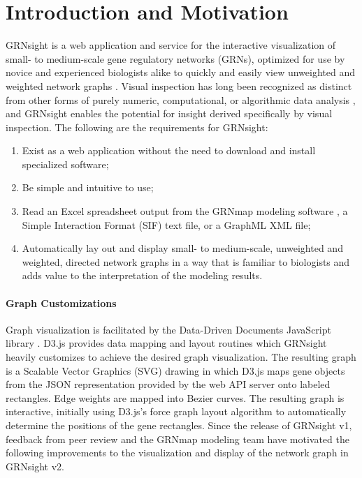 \documentclass[sigconf,review]{acmart}
\begin{document}
\section{Introduction and Motivation}

GRNsight is a web application and service for the interactive visualization of small- to medium-scale gene regulatory networks (GRNs), optimized for use by novice and experienced biologists alike to quickly and easily view unweighted and weighted network graphs \cite{peerj}. Visual inspection has long been recognized as distinct from other forms of purely numeric, computational, or algorithmic data analysis \cite{Tufte:1986:VDQ:33404, card1999readings}, and GRNsight enables the potential for insight derived specifically by visual inspection. The following are the requirements for GRNsight:

\begin{enumerate}
\item Exist as a web application without the need to download and install specialized software;
\item Be simple and intuitive to use;
\item Read an Excel spreadsheet output from the GRNmap modeling software \cite{Dahlquist2015}, a Simple Interaction Format (SIF) text file, or a GraphML XML file;
\item Automatically lay out and display small- to medium-scale, unweighted and weighted, directed network graphs in a way that is familiar to biologists and adds value to the interpretation of the modeling results.
\end{enumerate} 

\paragraph{Graph Customizations} Graph visualization is facilitated by the Data-Driven Documents JavaScript library \cite{d3}. D3.js provides data mapping and layout routines which GRNsight heavily customizes to achieve the desired graph visualization. The resulting graph is a Scalable Vector Graphics (SVG) drawing in which D3.js maps gene objects from the JSON representation provided by the web API server onto labeled rectangles. Edge weights are mapped into Bezier curves. The resulting graph is interactive, initially using D3.js's force graph layout algorithm to automatically determine the positions of the gene rectangles. Since the release of GRNsight v1, feedback from peer review and the GRNmap modeling team \cite{Dahlquist2015} have motivated the following improvements to the visualization and display of the network graph in GRNsight v2.
\end{document}
